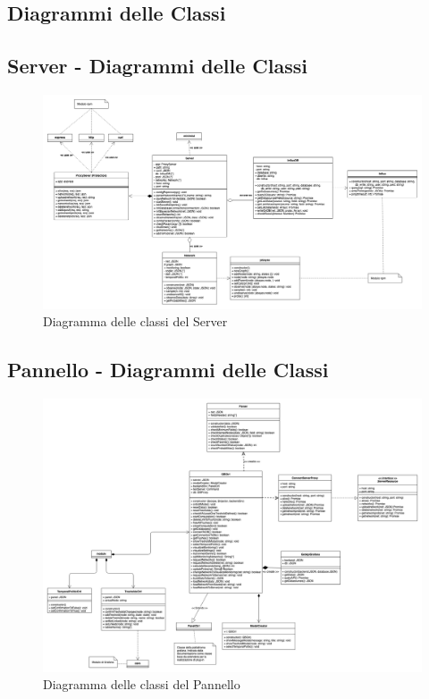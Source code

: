 \begin{landscape}
	\section{Diagrammi delle Classi}
	\subsection{Server - Diagrammi delle Classi}
	\begin{figure}[H]
		\begin{center}
			\includegraphics[scale=0.20]{./images/serverClassi.png} 
		\end{center}
		\caption{Diagramma delle classi del Server}
	\end{figure}
\end{landscape}

\begin{landscape}
	\subsection{Pannello - Diagrammi delle Classi}
\begin{figure}[H]
	\begin{center}
		\includegraphics[scale=0.29]{./images/panelClassi.png} 
	\end{center}
	\caption{Diagramma delle classi del Pannello}
\end{figure}
\end{landscape}
